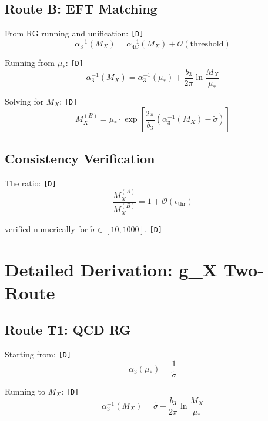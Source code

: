 \documentclass[11pt,a4paper]{article}
\newcommand{\tagD}{\textcolor{green!50!black}{\texttt{[D]}}}
\theoremstyle{definition}
\begin{document}
\subsection{Route B: EFT Matching}
\label{app:route-b-detail}

From RG running and unification: \tagD{}
\begin{equation}
\label{eq:app-rg-unif}
\alpha_3^{-1}(M_X) = \alpha_{4C}^{-1}(M_X) + \mathcal{O}(\text{threshold})
\end{equation}

Running from $\mu_*$: \tagD{}
\begin{equation}
\label{eq:app-rg-run}
\alpha_3^{-1}(M_X) = \alpha_3^{-1}(\mu_*) + \frac{b_3}{2\pi}\ln\frac{M_X}{\mu_*}
\end{equation}

Solving for $M_X$: \tagD{}
\begin{equation}
\label{eq:app-mx-route-b}
M_X^{(B)} = \mu_* \cdot \exp\left[\frac{2\pi}{b_3}\left(\alpha_3^{-1}(M_X) - \tilde{\sigma}\right)\right]
\end{equation}

\subsection{Consistency Verification}
\label{app:mx-consistency}

The ratio: \tagD{}
\begin{equation}
\label{eq:app-mx-ratio}
\frac{M_X^{(A)}}{M_X^{(B)}} = 1 + \mathcal{O}(\epsilon_{\text{thr}})
\end{equation}

verified numerically for $\tilde{\sigma} \in [10, 1000]$. \tagD{}

\section{Detailed Derivation: g\_X Two-Route}
\label{app:gx-derivation}

\subsection{Route T1: QCD RG}
\label{app:route-t1-detail}

Starting from: \tagD{}
\begin{equation}
\label{eq:app-t1-start}
\alpha_3(\mu_*) = \frac{1}{\tilde{\sigma}}
\end{equation}

Running to $M_X$: \tagD{}
\begin{equation}
\label{eq:app-t1-run}
\alpha_3^{-1}(M_X) = \tilde{\sigma} + \frac{b_3}{2\pi}\ln\frac{M_X}{\mu_*}
\end{equation}
\end{document}

